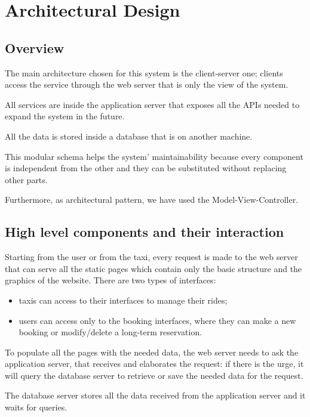 \section{Architectural Design}
\subsection{Overview}
	The main architecture chosen for this system is the client-server one; clients access the service through the web server that is only the view of the system. 
	
	All services are inside the application server that exposes all the APIs needed to expand the system in the future.
	
	All the data is stored inside a database that is on another machine.

	This modular schema helps the system' maintainability because every component is independent from the other and they can be substituted without replacing other parts. 
	
	Furthermore, as architectural pattern, we have used the Model-View-Controller.
\subsection{High level components and their interaction}
	Starting from the user or from the taxi, every request is made to the web server that can serve all the static pages which contain only the basic structure and the graphics of the website. There are two types of interfaces:
	\begin{itemize} 
		\item taxis can access to their interfaces to manage their rides; 
		\item users can access only to the booking interfaces, where they can make a new booking or modify/delete a long-term reservation.
	\end{itemize}
	To populate all the pages with the needed data, the web server needs to ask the application server, that receives and elaborates the request: if there is the urge, it will query the database server to retrieve or save the needed data for the request.
	
	The database server stores all the data received from the application server and it waits for queries.
